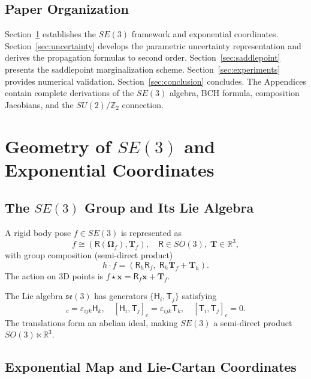 \documentclass[journal]{IEEEtran}
\newcommand{\real}{\mathbb{R}}
\newcommand{\bfOmega}{\boldsymbol{\Omega}}
\newcommand{\beq}{\begin{equation}}
\newcommand{\eeq}{\end{equation}}
\begin{document}
\subsection{Paper Organization}

Section~\ref{sec:SE3geometry} establishes the $SE(3)$ 
framework and exponential coordinates. 
Section~\ref{sec:uncertainty} develops the parametric 
uncertainty representation and derives the propagation 
formulas to second order. 
Section~\ref{sec:saddlepoint} presents the saddlepoint 
marginalization scheme. 
Section~\ref{sec:experiments} provides numerical validation.
Section~\ref{sec:conclusion} concludes. 
The Appendices contain complete derivations of the $SE(3)$ 
algebra, BCH formula, composition Jacobians, and the 
$SU(2)/\mathbb{Z}_2$ connection.

\section{Geometry of $SE(3)$ and Exponential Coordinates}
\label{sec:SE3geometry}

\subsection{The $SE(3)$ Group and Its Lie Algebra}

A rigid body pose $f \in SE(3)$ is represented as
\beq
    f \cong (\mathsf{R}(\bfOmega_f), \mathbf{T}_f),\quad
    \mathsf{R} \in SO(3),\; \mathbf{T} \in \real^3,
    \label{eq:SE3element}
\eeq
with group composition (semi-direct product)
\beq
    h \cdot f = (\mathsf{R}_h \mathsf{R}_f,\; \mathsf{R}_h \mathbf{T}_f + \mathbf{T}_h).
    \label{eq:groupcomp}
\eeq
The action on 3D points is $f \star \mathbf{x} = \mathsf{R}_f \mathbf{x} + \mathbf{T}_f$.

The Lie algebra $\mathfrak{se}(3)$ has generators 
$\{\mathsf{H}_i, \mathsf{T}_j\}$ satisfying
\beq
    [\mathsf{H}_i, \mathsf{H}_j]_c = \varepsilon_{ijk}\mathsf{H}_k,\quad
    [\mathsf{H}_i, \mathsf{T}_j]_c = \varepsilon_{ijk}\mathsf{T}_k,\quad
    [\mathsf{T}_i, \mathsf{T}_j]_c = 0.
    \label{eq:sealgebra}
\eeq
The translations form an abelian ideal, making $SE(3)$ a 
semi-direct product $SO(3) \ltimes \real^3$.

\subsection{Exponential Map and Lie-Cartan Coordinates}
\end{document}

